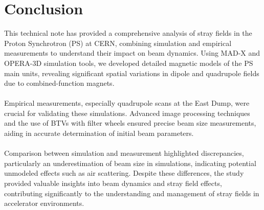 \documentclass{cernatsnote}
\begin{document}
%


\section{Conclusion}
This technical note has provided a comprehensive analysis of stray fields in the Proton Synchrotron (PS) at CERN, combining simulation and empirical measurements to understand their impact on beam dynamics. Using MAD-X and OPERA-3D simulation tools, we developed detailed magnetic models of the PS main units, revealing significant spatial variations in dipole and quadrupole fields due to combined-function magnets.
\\
\\
Empirical measurements, especially quadrupole scans at the East Dump, were crucial for validating these simulations. Advanced image processing techniques and the use of BTVs with filter wheels ensured precise beam size measurements, aiding in accurate determination of initial beam parameters.
\\
\\
Comparison between simulation and measurement highlighted discrepancies, particularly an underestimation of beam size in simulations, indicating potential unmodeled effects such as air scattering. Despite these differences, the study provided valuable insights into beam dynamics and stray field effects, contributing significantly to the understanding and management of stray fields in accelerator environments.

\newpage



\newpage
\appendix

\end{document}
